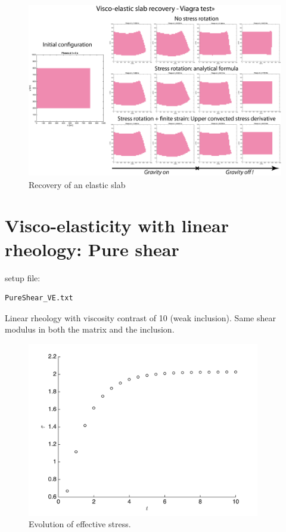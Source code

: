 \documentclass[12pt,english,openany]{scrbook}
\begin{document}
\begin{figure}[ht!]
\centerline{\includegraphics[height=3.0in]{./Figures/ViagraTest_MDOODZ}}
\caption{Recovery of an elastic slab}
\label{ViagraTest}
\end{figure}

\section{Visco-elasticity with linear rheology: Pure shear}

setup file:
\begin{verbatim} 
PureShear_VE.txt
\end{verbatim}

Linear rheology with viscosity contrast of 10 (weak inclusion).
Same shear modulus in both the matrix and the inclusion.

\begin{figure}[ht!]
\centerline{\includegraphics[height=3.0in]{./Figures/PureShear_VE_evol}}
\caption{Evolution of effective stress.}
\label{PureShear_VE_evol}
\end{figure}
\end{document}
